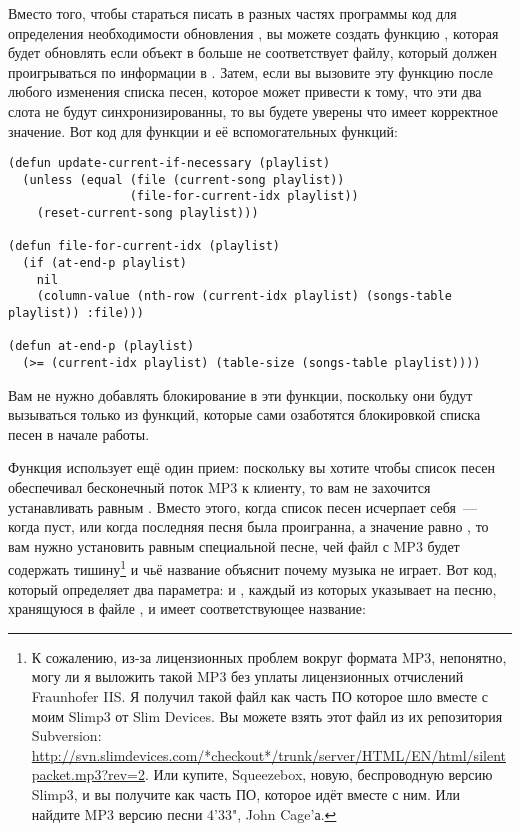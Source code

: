 Вместо того, чтобы стараться писать в разных частях программы код для определения
необходимости обновления , вы можете создать функцию
, которая будет обновлять  если
объект  в  больше не соответствует файлу, который должен
проигрываться по информации в . Затем, если вы вызовите эту функцию
после любого изменения списка песен, которое может привести к тому, что эти два слота не
будут синхронизированны, то вы будете уверены что  имеет корректное
значение.  Вот код для функции  и её вспомогательных
функций:

\begin{lstlisting}
(defun update-current-if-necessary (playlist)
  (unless (equal (file (current-song playlist))
                 (file-for-current-idx playlist))
    (reset-current-song playlist)))

(defun file-for-current-idx (playlist)
  (if (at-end-p playlist)
    nil
    (column-value (nth-row (current-idx playlist) (songs-table playlist)) :file)))

(defun at-end-p (playlist)
  (>= (current-idx playlist) (table-size (songs-table playlist))))
\end{lstlisting}

Вам не нужно добавлять блокирование в эти функции, поскольку они будут вызываться только
из функций, которые сами озаботятся блокировкой списка песен в начале работы.

Функция  использует ещё один прием: поскольку вы хотите чтобы
список песен обеспечивал бесконечный поток MP3 к клиенту, то вам не захочится
устанавливать  равным . Вместо этого, когда список песен
исчерпает себя~--- когда  пуст, или когда последняя песня была
проигранна, а значение  равно , то вам нужно установить
 равным специальной песне, чей файл с MP3 будет содержать
тишину\footnote{К сожалению, из-за лицензионных проблем вокруг формата MP3, непонятно,
  могу ли я выложить такой MP3 без уплаты лицензионных отчислений Fraunhofer IIS.  Я
  получил такой файл как часть ПО которое шло вместе с моим Slimp3 от Slim Devices. Вы
  можете взять этот файл из их репозитория Subversion:
  \url{http://svn.slimdevices.com/*checkout*/trunk/server/HTML/EN/html/silentpacket.mp3?rev=2}.
  Или купите, Squeezebox, новую, беспроводную версию Slimp3, и вы получите
   как часть ПО, которое идёт вместе с ним. Или найдите MP3 версию
  песни 4'33", John Cage'а.} и чьё название объяснит почему музыка не играет.  Вот код,
который определяет два параметра:  и
, каждый из которых указывает на песню, хранящуюся в файле
, и имеет соответствующее название:

